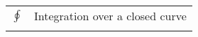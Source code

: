 \begin{longtable}{ p{}  p{} } 
$ \oint $ & Integration over a closed curve \\
\addlinespace[15pt]
\end{longtable}